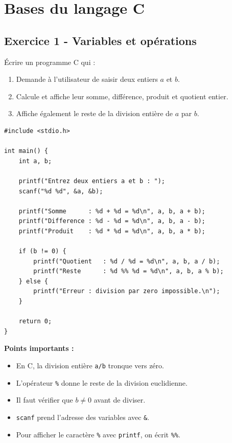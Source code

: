 \documentclass[12pt,a4paper]{article}
\begin{document}
\newpage
\section{Bases du langage C}

\subsection*{Exercice 1 - Variables et opérations \niveau{\facile}}

\begin{boiteexercice}
Écrire un programme C qui :
\begin{enumerate}
  \item Demande à l'utilisateur de saisir deux entiers $a$ et $b$.
  \item Calcule et affiche leur somme, différence, produit et quotient entier.
  \item Affiche également le reste de la division entière de $a$ par $b$.
\end{enumerate}
\end{boiteexercice}

\begin{boitecorrige}
\begin{lstlisting}
#include <stdio.h>

int main() {
    int a, b;

    printf("Entrez deux entiers a et b : ");
    scanf("%d %d", &a, &b);

    printf("Somme      : %d + %d = %d\n", a, b, a + b);
    printf("Difference : %d - %d = %d\n", a, b, a - b);
    printf("Produit    : %d * %d = %d\n", a, b, a * b);

    if (b != 0) {
        printf("Quotient   : %d / %d = %d\n", a, b, a / b);
        printf("Reste      : %d %% %d = %d\n", a, b, a % b);
    } else {
        printf("Erreur : division par zero impossible.\n");
    }

    return 0;
}
\end{lstlisting}

\textbf{Points importants :}
\begin{itemize}[nosep]
  \item En C, la division entière \texttt{a/b} tronque vers zéro.
  \item L'opérateur \texttt{\%} donne le reste de la division euclidienne.
  \item Il faut vérifier que $b\neq0$ avant de diviser.
  \item \texttt{scanf} prend l'adresse des variables avec \texttt{\&}.
  \item Pour afficher le caractère \texttt{\%} avec \texttt{printf}, on écrit \texttt{\%\%}.
\end{itemize}
\end{boitecorrige}
\end{document}
